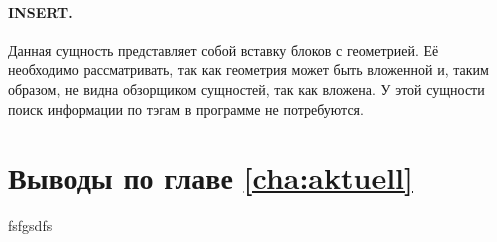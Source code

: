 \paragraph{INSERT.} Данная сущность представляет собой вставку блоков с геометрией. Её необходимо рассматривать, так как геометрия может быть вложенной и, таким образом, не видна обзорщиком сущностей, так как вложена. У этой сущности поиск информации по тэгам в программе не потребуются.


\section{Выводы по главе \ref{cha:aktuell}}
fsfgsdfs
